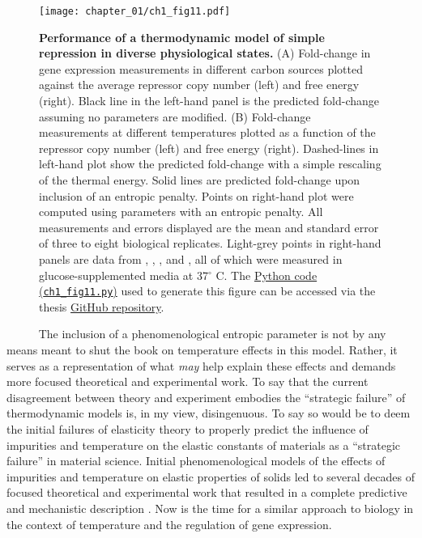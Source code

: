 \documentclass[12pt]{caltech_thesis}
\begin{document}
\hypertarget{fig:growth_results_intro}{%
\begin{figure}
\centering
\texttt{[image: chapter\_01/ch1\_fig11.pdf]}
\caption[{Performance of a simple thermodynamic model of simple
repression in diverse physiological states.}]{\textbf{Performance of a
thermodynamic model of simple repression in diverse physiological
states.} (A) Fold-change in gene expression measurements in different
carbon sources plotted against the average repressor copy number (left)
and free energy (right). Black line in the left-hand panel is the
predicted fold-change assuming no parameters are modified. (B)
Fold-change measurements at different temperatures plotted as a function
of the repressor copy number (left) and free energy (right).
Dashed-lines in left-hand plot show the predicted fold-change with a
simple rescaling of the thermal energy. Solid lines are predicted
fold-change upon inclusion of an entropic penalty. Points on right-hand
plot were computed using parameters with an entropic penalty. All
measurements and errors displayed are the mean and standard error of
three to eight biological replicates. Light-grey points in right-hand
panels are data from \textcite{garcia2011}, \textcite{brewster2014},
\textcite{razo-mejia2018}, and \textcite{chure2019}, all of which were
measured in glucose-supplemented media at 37\(^\circ\) C. The
\href{https://github.com/gchure/phd/blob/master/src/chapter_01/code/ch1_fig11.py}{Python
code (\texttt{ch1\_fig11.py})} used to generate this figure can be
accessed via the thesis \href{https://github.com/gchure/phd}{GitHub
repository}.}
\label{fig:growth_results_intro}
\end{figure}
}

~~~~~ The inclusion of a phenomenological entropic parameter is not by
any means meant to shut the book on temperature effects in this model.
Rather, it serves as a representation of what \emph{may} help explain
these effects and demands more focused theoretical and experimental
work. To say that the current disagreement between theory and experiment
embodies the ``strategic failure'' of thermodynamic models is, in my
view, disingenuous. To say so would be to deem the initial failures of
elasticity theory to properly predict the influence of impurities and
temperature on the elastic constants of materials as a ``strategic
failure'' in material science. Initial phenomenological models of the
effects of impurities and temperature on elastic properties of solids
\autocite{friedel1974} led to several decades of focused theoretical and
experimental work that resulted in a complete predictive and mechanistic
description \autocite{phillips2001}. Now is the time for a similar
approach to biology in the context of temperature and the regulation of
gene expression.
\end{document}
